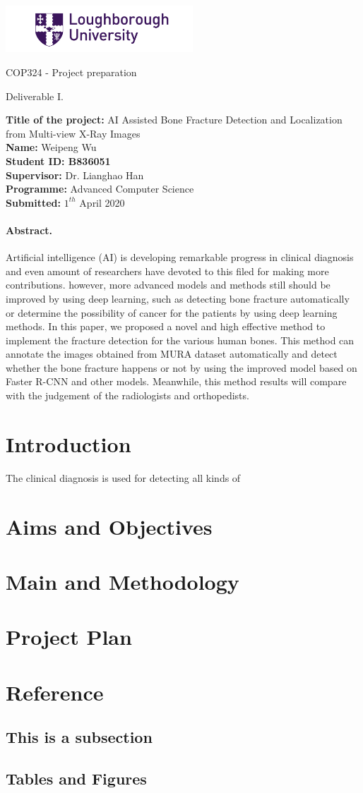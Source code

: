 \documentclass[12pt,oneside,a4paper]{article}
\newcommand*{\makeTitleParagraph}{
\begingroup
\begin{center}
\includegraphics[width = 7cm]{LoughboroughLogo.png} \par
COP324 - Project preparation\par
Deliverable I. \par
\end{center}

 
\noindent


\noindent
\textbf{Title of the project:} AI Assisted Bone Fracture Detection and Localization from Multi-view X-Ray Images\\ 
\textbf{Name:} Weipeng Wu\\
\textbf{Student ID: B836051}\\
\textbf{Supervisor:} Dr. Lianghao Han\\
\textbf{Programme:} Advanced Computer Science\\
\textbf{Submitted:} $1^{th}$ April 2020\\
\endgroup}
\begin{document}
\makeTitleParagraph %

\paragraph{Abstract.} Artificial intelligence (AI) is developing remarkable progress in clinical diagnosis and even amount of researchers have devoted to this filed for making more contributions. however, more advanced models and methods still should be improved by using deep learning, such as detecting bone fracture automatically or determine the possibility of cancer for the patients by using deep learning methods. In this paper, we proposed a novel and high effective method to implement the fracture detection for the various human bones. This method can annotate the images obtained from MURA dataset automatically and detect whether the bone fracture happens or not by using the improved model based on Faster R-CNN and other models. Meanwhile, this method results will compare with the judgement of the radiologists and orthopedists.

\section{Introduction}
The clinical diagnosis is used for detecting all kinds of

\section{Aims and Objectives}
\section{Main and Methodology}
\section{Project Plan}
\section{Reference}
\subsection{This is a subsection}

\subsection{Tables and Figures}
\end{document}
